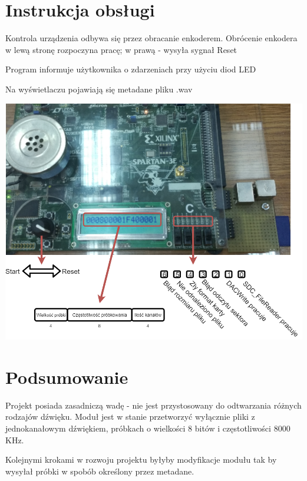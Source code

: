 \documentclass{article}
\begin{document}
\section{Instrukcja obsługi}
\par Kontrola urządzenia odbywa się przez obracanie enkoderem. Obrócenie enkodera w lewą stronę rozpoczyna pracę; w prawą - wysyła sygnał Reset
\par Program informuje użytkownika o zdarzeniach przy użyciu diod LED
\par Na wyświetlaczu pojawiają się metadane pliku .wav
\begin{center}
	\includegraphics[scale=0.6, center]{photo/photo_2.png}
\end{center}
\newpage
\section{Podsumowanie}
\par Projekt posiada zasadniczą wadę - nie jest przystosowany do odtwarzania różnych rodzajów dźwięku. Moduł jest w stanie przetworzyć wyłącznie pliki z jednokanałowym dźwiękiem, próbkach o wielkości 8 bitów i częstotliwości 8000 KHz. 
\par Kolejnymi krokami w rozwoju projektu byłyby modyfikacje modułu tak by wysyłał próbki w spobób określony przez metadane.
\newpage




\end{document}
